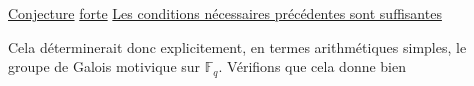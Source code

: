 

\uline{Conjecture}  \uline{forte} \uline{Les conditions nécessaires précédentes sont suffisantes}

Cela déterminerait donc explicitement, en termes arithmétiques simples, le groupe de Galois motivique  sur $\mathbb F_q$. Vérifions que cela donne bien

